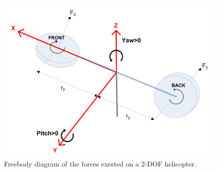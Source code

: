 \begin{figure}[!htbp]
 \begin{center}
  \includegraphics[scale=.75]{figs/img/helicopterModel.png}
 \end{center}
\caption{Freebody diagram of the forces exerted on a 2-DOF helicopter.}
\label{fig:helicopterModel}
\end{figure}

